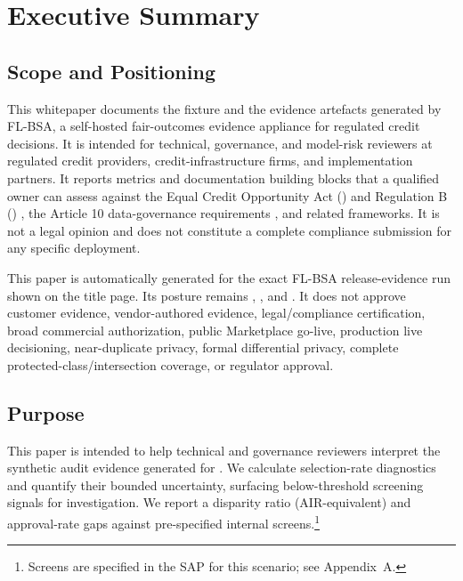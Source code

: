 
\section{Executive Summary}

\subsection{Scope and Positioning}
This whitepaper documents the \ScenarioLabel{} fixture and the evidence artefacts generated by FL-BSA, a self-hosted fair-outcomes evidence appliance for regulated credit decisions. It is intended for technical, governance, and model-risk reviewers at regulated credit providers, credit-infrastructure firms, and implementation partners. It reports metrics and documentation building blocks that a qualified owner can assess against the Equal Credit Opportunity Act (\ECOA) and Regulation B (\RegB) \citep{cfpb_regb_2026}, the \EUAIAct{} Article 10 data-governance requirements \citep{eu_ai_act}, and related frameworks. It is not a legal opinion and does not constitute a complete compliance submission for any specific deployment.

\noindent This paper is automatically generated for the exact FL-BSA \ProductReleaseTag{} release-evidence run shown on the title page. Its posture remains , , and . It does not approve customer evidence, vendor-authored evidence, legal/compliance certification, broad commercial authorization, public Marketplace go-live, production live decisioning, near-duplicate privacy, formal differential privacy, complete protected-class/intersection coverage, or regulator approval.

\subsection{Purpose}
This paper is intended to help technical and governance reviewers interpret the synthetic audit evidence generated for \ScenarioLabel{}. We calculate selection-rate diagnostics and quantify their bounded uncertainty, surfacing below-threshold screening signals for investigation. We report a disparity ratio (AIR-equivalent) and approval-rate gaps against pre-specified internal screens.\footnote{Screens are specified in the SAP for this scenario; see Appendix~A.}


